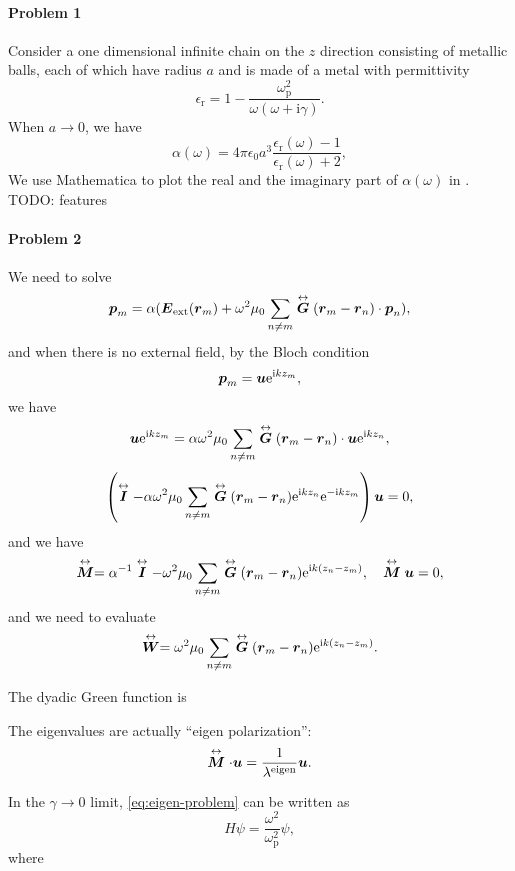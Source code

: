 \documentclass[hyperref, a4paper]{article}
\newcommand*{\ii}{\mathrm{i}}
\newcommand*{\ee}{\mathrm{e}}
\renewcommand{\tensor}[1]{ \stackrel{\leftrightarrow}{\vb*{#1}}}
\begin{document}
\paragraph{Problem 1} Consider a one dimensional infinite chain on the $z$ direction consisting of metallic balls, 
each of which have radius $a$ and is made of a metal with permittivity
\begin{equation}
    \epsilon_\text{r} = 1 - \frac{\omega_\text{p}^2}{\omega (\omega + \ii \gamma)}.
\end{equation} 
When $a \to 0$, we have
\begin{equation}
    \alpha(\omega) = 4 \pi \epsilon_0 a^3 \frac{\epsilon_\text{r}(\omega) - 1}{\epsilon_\text{r}(\omega) + 2},
\end{equation}
We use Mathematica to plot the real and the imaginary part of $\alpha(\omega)$ in . 
TODO: features

\paragraph{}

\paragraph{Problem 2} We need to solve 
\begin{equation}
    \vb*{p}_m = \alpha (\vb*{E}_\text{ext}(\vb*{r}_m) + \omega^2 \mu_0 \sum_{n \neq m} \tensor{\vb*{G}}(\vb*{r}_m - \vb*{r}_n) \cdot \vb*{p}_n),
\end{equation}
and when there is no external field, by the Bloch condition 
\begin{equation}
    \vb*{p}_m = \vb*{u} \ee^{\ii k z_m},
\end{equation}
we have 
\[
    \vb*{u} \ee^{\ii k z_m} = \alpha \omega^2 \mu_0 \sum_{n \neq m} \tensor{\vb*{G}}(\vb*{r}_m - \vb*{r}_n) \cdot \vb*{u} \ee^{\ii k z_n},
\]
\[
    \left( \tensor{\vb*{I}} - \alpha \omega^2 \mu_0 \sum_{n \neq m} \tensor{\vb*{G}}(\vb*{r}_m - \vb*{r}_n) \ee^{\ii k z_n} \ee^{- \ii k z_m}  \right) \vb*{u}  = 0,
\]
and we have 
\begin{equation}
    \tensor{\vb*{M}} = \alpha^{-1} \tensor{ \vb*{I}} - \omega^2 \mu_0 \sum_{n \neq m} \tensor{\vb*{G}}(\vb*{r}_m - \vb*{r}_n) \ee^{\ii k (z_n - z_m)}, \quad \tensor{\vb*{M}} \vb*{u} = 0,
    \label{eq:eigen-problem}
\end{equation}
and we need to evaluate 
\begin{equation}
    \tensor{\vb*{W}} = \omega^2 \mu_0 \sum_{n \neq m} \tensor{\vb*{G}}(\vb*{r}_m - \vb*{r}_n) \ee^{\ii k (z_n - z_m)}.
\end{equation}

The dyadic Green function is 


The eigenvalues are actually ``eigen polarization'':
\begin{equation}
    \tensor{\vb*{M}} \cdot \vb*{u} = \frac{1}{\lambda^\text{eigen}} \vb*{u}.
\end{equation}

In the $\gamma \to 0$ limit, \eqref{eq:eigen-problem} can be written as 
\begin{equation}
    H \psi = \frac{\omega^2}{\omega_\text{p}^2} \psi,
\end{equation}
where 
\end{document}
